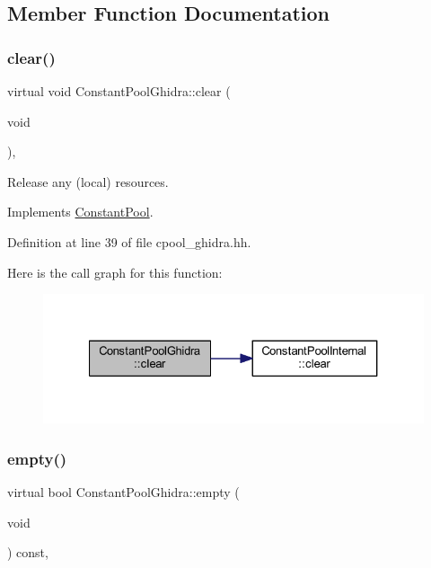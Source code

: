 \subsection{Member Function Documentation}
\mbox{\label{class_constant_pool_ghidra_ac0b80eac8d8d3a5abf9db557ae9336fc}} 
\subsubsection{\texorpdfstring{clear()}{clear()}}
{\footnotesize\ttfamily virtual void Constant\+Pool\+Ghidra\+::clear (\begin{DoxyParamCaption}\item[{void}]{ }\end{DoxyParamCaption})\hspace{0.3cm}{\ttfamily [inline]}, {\ttfamily [virtual]}}



Release any (local) resources. 



Implements \mbox{\hyperlink{class_constant_pool_a3cb5e39704c4dacbe8782742c2f218c4}{Constant\+Pool}}.



Definition at line 39 of file cpool\+\_\+ghidra.\+hh.

Here is the call graph for this function\+:
\nopagebreak
\begin{figure}[H]
\begin{center}
\leavevmode
\includegraphics[width=327pt]{class_constant_pool_ghidra_ac0b80eac8d8d3a5abf9db557ae9336fc_cgraph}
\end{center}
\end{figure}
\mbox{\label{class_constant_pool_ghidra_a224351241fabcf4ebb2a0d2701b63e40}} 
\subsubsection{\texorpdfstring{empty()}{empty()}}
{\footnotesize\ttfamily virtual bool Constant\+Pool\+Ghidra\+::empty (\begin{DoxyParamCaption}\item[{void}]{ }\end{DoxyParamCaption}) const\hspace{0.3cm}{\ttfamily [inline]}, {\ttfamily [virtual]}}



